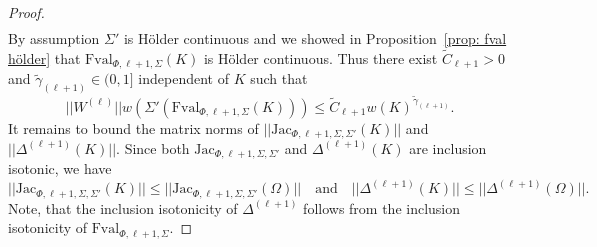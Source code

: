 \documentclass[10pt,a4paper]{amsart}
\begin{document}
\begin{proof}
\begin{align*}
		\end{align*}
		By assumption $\Sigma'$ is Hölder continuous and we showed in Proposition~\ref{prop: fval hölder} that $\mathrm{Fval}_{\Phi , {\ell}+1, \Sigma}({K})$ is Hölder continuous. Thus there exist $\tilde{C}_{\ell +1} > 0$ and $\tilde{\gamma}_{(\ell+1)} \in (0,1]$ independent of $K$ such that
		$$ ||W^{(\ell)}||w(\Sigma'(\mathrm{Fval}_{\Phi , {\ell}+1, \Sigma}({K}))) \leq \tilde{C}_{\ell +1}w(K)^{\tilde{\gamma}_{(\ell+1)}}. $$
		It remains to bound the matrix norms of $||\mathrm{Jac}_{\Phi,{\ell}+1, \Sigma, \Sigma'}({K})||$ and $||\Delta^{(\ell+1)}(K)||$. Since both $\mathrm{Jac}_{\Phi,{\ell}+1, \Sigma, \Sigma'}$ and $\Delta^{(\ell+1)}(K)$ are inclusion isotonic, we have
		$$||\mathrm{Jac}_{\Phi,{\ell}+1, \Sigma, \Sigma'}({K})|| \leq ||\mathrm{Jac}_{\Phi,{\ell}+1, \Sigma, \Sigma'}({\Omega})|| \quad \text{and} \quad ||\Delta^{(\ell+1)}(K)|| \leq ||\Delta^{(\ell+1)}(\Omega)||.$$
		Note, that the inclusion isotonicity of $\Delta^{(\ell+1)}$ follows from the inclusion isotonicity of $\mathrm{Fval}_{\Phi, \ell+1, \Sigma}$.
	\end{proof}
\end{document}
